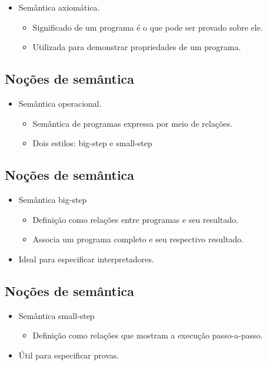 \documentclass[11pt]{article}
\begin{document}
\begin{itemize}
\item Semântica axiomática.
\begin{itemize}
\item Significado de um programa é o que pode ser provado sobre ele.
\item Utilizada para demonstrar propriedades de um programa.
\end{itemize}
\end{itemize}
\subsection*{Noções de semântica}
\label{sec:orga7abb8e}

\begin{itemize}
\item Semântica operacional.
\begin{itemize}
\item Semântica de programas expressa por meio de relações.
\item Dois estilos: big-step e small-step
\end{itemize}
\end{itemize}
\subsection*{Noções de semântica}
\label{sec:orgc30a768}

\begin{itemize}
\item Semântica big-step
\begin{itemize}
\item Definição como relações entre programas e seu resultado.
\item Associa um programa completo e seu respectivo resultado.
\end{itemize}
\item Ideal para especificar interpretadores.
\end{itemize}
\subsection*{Noções de semântica}
\label{sec:orgaf28c7d}

\begin{itemize}
\item Semântica small-step
\begin{itemize}
\item Definição como relações que mostram a execução passo-a-passo.
\end{itemize}

\item Útil para especificar provas.
\end{itemize}
\end{document}
